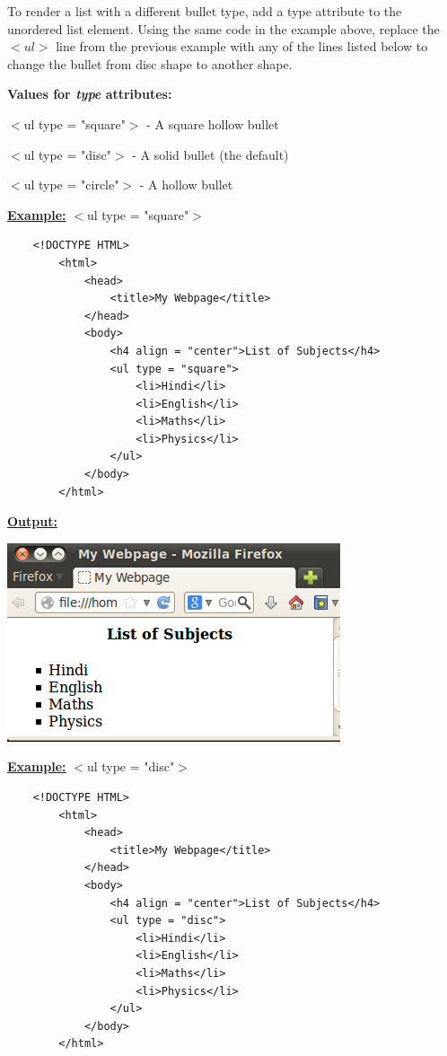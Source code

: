 \documentclass[11pt,a4paper]{article}
\begin{document}
\begin{description}
To render a list with a different bullet type, add a type attribute to the unordered list element. Using the same code in the example above, replace the $<ul>$ line from the previous example with any of the lines listed below to change the bullet from disc shape to another shape.\

\textbf{Values for \emph{type} attributes:}\

$<$ul type = "square"$>$ -  A square hollow bullet

$<$ul type = "disc"$>$ - A solid bullet (the default)

$<$ul type = "circle"$>$ - A hollow bullet\

\underline{\textbf{Example:}} $<$ul type = "square"$>$
\begin{verbatim}
    <!DOCTYPE HTML>
        <html>
            <head>
                <title>My Webpage</title>
            </head>
            <body>
                <h4 align = "center">List of Subjects</h4>
                <ul type = "square">
                    <li>Hindi</li>
                    <li>English</li>
                    <li>Maths</li>
                    <li>Physics</li>
                </ul>
            </body>
        </html>
\end{verbatim}

\underline{\textbf{Output:}}

\includegraphics[scale=0.7]{square.png}\

\underline{\textbf{Example:}} $<$ul type = "disc"$>$
\begin{verbatim}
    <!DOCTYPE HTML>
        <html>
            <head>
                <title>My Webpage</title>
            </head>
            <body>
                <h4 align = "center">List of Subjects</h4>
                <ul type = "disc">
                    <li>Hindi</li>
                    <li>English</li>
                    <li>Maths</li>
                    <li>Physics</li>
                </ul>
            </body>
        </html>
\end{verbatim}



\end{description}
\end{document}
